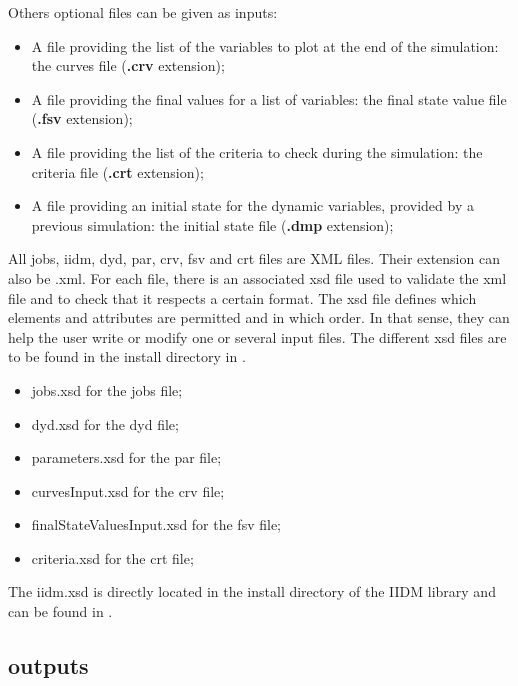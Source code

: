 \documentclass[a4paper, 12pt]{report}
\begin{document}
Others optional files can be given as inputs:
\begin{itemize}
\item A file providing the list of the variables to plot at the end of the simulation: the curves file (\textbf{.crv} extension);
\item A file providing the final values for a list of variables: the final state value file (\textbf{.fsv} extension);
\item A file providing the list of the criteria to check during the simulation: the criteria file (\textbf{.crt} extension);
\item A file providing an initial state for the dynamic variables, provided by a previous \Dynawo simulation: the initial state file (\textbf{.dmp} extension);
\end{itemize}

All jobs, iidm, dyd, par, crv, fsv and crt files are XML files.
Their extension can also be .xml.
For each file, there is an associated xsd file used to validate the xml file and to check that it respects a certain format.
The xsd file defines which elements and attributes are permitted and in which order.
In that sense, they can help the user write or modify one or several input files.
The different xsd files are to be found in the install directory in .

\begin{itemize}
\item jobs.xsd for the jobs file;
\item dyd.xsd for the dyd file;
\item parameters.xsd for the par file;
\item curvesInput.xsd for the crv file;
\item finalStateValuesInput.xsd for the fsv file;
\item criteria.xsd for the crt file;
\end{itemize}

The iidm.xsd is directly located in the install directory of the IIDM library and can be found in .

\subsection[Dynawo outputs]{\Dynawo outputs}
\end{document}
